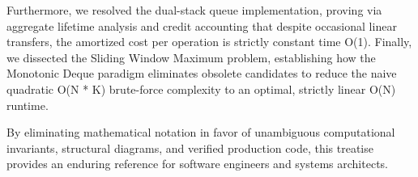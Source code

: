 \documentclass[10pt,journal,compsoc,onecolumn]{IEEEtran}
\begin{document}
Furthermore, we resolved the dual-stack queue implementation, proving via aggregate lifetime analysis and credit accounting that despite occasional linear transfers, the amortized cost per operation is strictly constant time O(1). Finally, we dissected the Sliding Window Maximum problem, establishing how the Monotonic Deque paradigm eliminates obsolete candidates to reduce the naive quadratic O(N * K) brute-force complexity to an optimal, strictly linear O(N) runtime. 

By eliminating mathematical notation in favor of unambiguous computational invariants, structural diagrams, and verified production code, this treatise provides an enduring reference for software engineers and systems architects.
\end{document}
